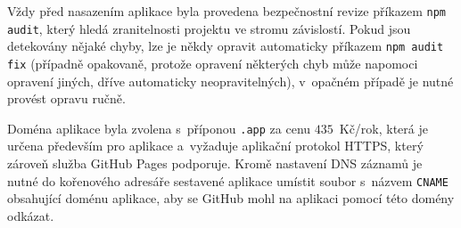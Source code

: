 Vždy před nasazením aplikace byla provedena bezpečnostní revize příkazem \texttt{npm audit}, který hledá zranitelnosti projektu ve stromu závislostí. Pokud jsou detekovány nějaké chyby, lze je někdy opravit automaticky příkazem \texttt{npm audit fix} (případně opakovaně, protože opravení některých chyb může napomoci opravení jiných, dříve automaticky neopravitelných), v~opačném případě je nutné provést opravu ručně.

Doména aplikace byla zvolena s~příponou \texttt{.app} za cenu $435$~Kč/rok, která je určena především pro aplikace a~vyžaduje aplikační protokol HTTPS, který zároveň služba GitHub Pages podporuje. Kromě nastavení DNS záznamů je nutné do kořenového adresáře sestavené aplikace umístit soubor s~názvem \texttt{CNAME} obsahující doménu aplikace, aby se GitHub mohl na aplikaci  pomocí této domény odkázat.

